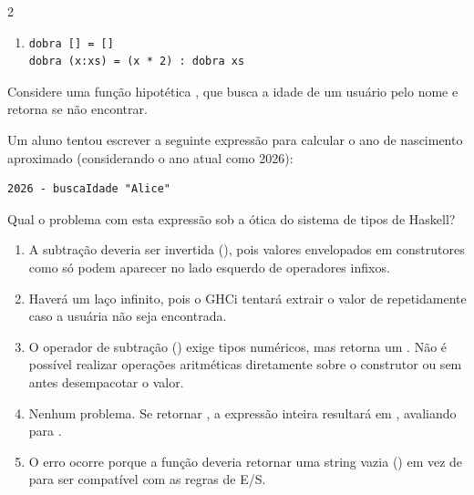 \documentclass[a4paper,10pt,brazil]{article}
\begin{document}
\begin{multicols}{2}
\begin{enumerate}
  \item \begin{verbatim}
dobra [] = []
dobra (x:xs) = (x * 2) : dobra xs
\end{verbatim}


\end{enumerate}

Considere uma função hipotética , que busca a idade de um usuário pelo nome e retorna  se não encontrar. 

Um aluno tentou escrever a seguinte expressão para calcular o ano de nascimento aproximado (considerando o ano atual como 2026):
\begin{verbatim}
2026 - buscaIdade "Alice"
\end{verbatim}

Qual o problema com esta expressão sob a ótica do sistema de tipos de Haskell?

\begin{enumerate}
  \item A subtração deveria ser invertida (), pois valores envelopados em construtores como  só podem aparecer no lado esquerdo de operadores infixos.

  \item Haverá um laço infinito, pois o GHCi tentará extrair o valor de  repetidamente caso a usuária não seja encontrada.

  \item O operador de subtração (\haskellinline{-}) exige tipos numéricos, mas  retorna um . Não é possível realizar operações aritméticas diretamente sobre o construtor  ou  sem antes desempacotar o valor.

  \item Nenhum problema. Se  retornar , a expressão inteira resultará em , avaliando para .

  \item O erro ocorre porque a função  deveria retornar uma string vazia () em vez de  para ser compatível com as regras de E/S.


\end{enumerate}


\end{multicols}
\end{document}
